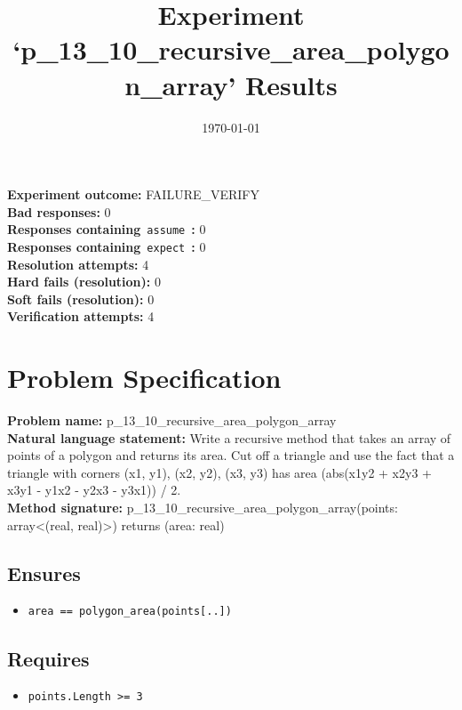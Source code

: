 \documentclass{article}
\begin{document}
\title{Experiment `p\_13\_10\_recursive\_area\_polygon\_array' Results}
\author{\today}
\date{}
\maketitle
\textbf{Experiment outcome: }FAILURE\_VERIFY
\\\textbf{Bad responses: }0
\\\textbf{Responses containing}~\texttt{assume}~\textbf{: }0
\\\textbf{Responses containing}~\texttt{expect}~\textbf{: }0
\\\textbf{Resolution attempts: }4
\\\textbf{Hard fails (resolution): }0
\\\textbf{Soft fails (resolution): }0
\\\textbf{Verification attempts: }4
\section*{Problem Specification}
\textbf{Problem name: }p\_13\_10\_recursive\_area\_polygon\_array
\\\textbf{Natural language statement: }Write a recursive method that takes an array of points of a polygon and returns its area. Cut off a triangle and use the fact that a triangle with corners (x1, y1), (x2, y2), (x3, y3) has area (abs(x1y2 + x2y3 + x3y1 - y1x2 - y2x3 - y3x1)) / 2.
\\\textbf{Method signature: }p\_13\_10\_recursive\_area\_polygon\_array(points: array<(real, real)>) returns (area: real)
\subsection*{Ensures}
\begin{itemize}
\item \texttt{area == polygon\_area(points[..])}
\end{itemize}
\subsection*{Requires}
\begin{itemize}
\item \texttt{points.Length >= 3}
\end{itemize}
\end{document}
